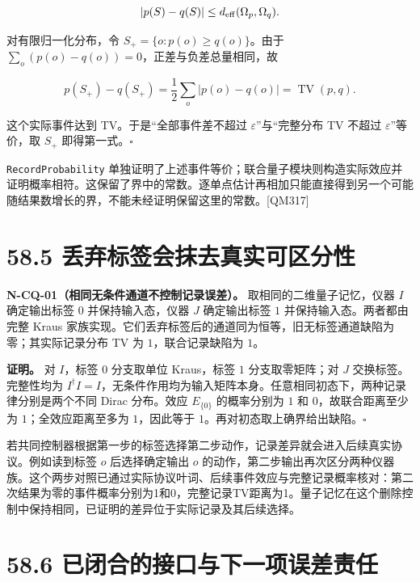 \documentclass[
  11pt,
  oneside]{book}
\begin{document}
\[
|p(S)-q(S)|\le d_{\rm eff}(\Omega_p,\Omega_q).
\]

对有限归一化分布，令 \(S_+=\{o:p(o)\ge q(o)\}\)。由于
\(\sum_o(p(o)-q(o))=0\)，正差与负差总量相同，故

\[
p(S_+)-q(S_+)=\frac12\sum_o|p(o)-q(o)|=\operatorname{TV}(p,q).
\]

这个实际事件达到 TV。于是``全部事件差不超过
\(\varepsilon\)''与``完整分布 TV 不超过 \(\varepsilon\)''等价，取
\(S_+\) 即得第一式。\(\square\)

\texttt{RecordProbability}
单独证明了上述事件等价；联合量子模块则构造实际效应并证明概率相符。这保留了界中的常数。逐单点估计再相加只能直接得到另一个可能随结果数增长的界，不能未经证明保留这里的常数。{[}QM317{]}

\hypertarget{ux4e22ux5f03ux6807ux7b7eux4f1aux62b9ux53bbux771fux5b9eux53efux533aux5206ux6027}{%
\section{58.5
丢弃标签会抹去真实可区分性}\label{ux4e22ux5f03ux6807ux7b7eux4f1aux62b9ux53bbux771fux5b9eux53efux533aux5206ux6027}}

\protect\hypertarget{n-cq-01}{}{}

\textbf{N-CQ-01（相同无条件通道不控制记录误差）。}
取相同的二维量子记忆，仪器 \(I\) 确定输出标签 \(0\) 并保持输入态，仪器
\(J\) 确定输出标签 \(1\) 并保持输入态。两者都由完整 Kraus
家族实现。它们丢弃标签后的通道同为恒等，旧无标签通道缺陷为零；其实际记录分布
TV 为 \(1\)，联合记录缺陷为 \(1\)。

\textbf{证明。} 对 \(I\)，标签 \(0\) 分支取单位 Kraus，标签 \(1\)
分支取零矩阵；对 \(J\) 交换标签。完整性均为
\(I^\dagger I=I\)，无条件作用均为输入矩阵本身。任意相同初态下，两种记录律分别是两个不同
Dirac 分布。效应 \(E_{\{0\}}\) 的概率分别为 \(1\) 和
\(0\)，故联合距离至少为 \(1\)；全效应距离至多为 \(1\)，因此等于
\(1\)。再对初态取上确界给出缺陷。\(\square\)

若共同控制器根据第一步的标签选择第二步动作，记录差异就会进入后续真实协议。例如读到标签
\(o\) 后选择确定输出 \(o\)
的动作，第二步输出再次区分两种仪器族。这个两步对照已通过实际协议叶词、后续事件效应与完整记录概率核对：第二次结果为零的事件概率分别为1和0，完整记录TV距离为1。量子记忆在这个删除控制中保持相同，已证明的差异位于实际记录及其后续选择。

\hypertarget{ux5df2ux95edux5408ux7684ux63a5ux53e3ux4e0eux4e0bux4e00ux9879ux8befux5deeux8d23ux4efb}{%
\section{58.6
已闭合的接口与下一项误差责任}\label{ux5df2ux95edux5408ux7684ux63a5ux53e3ux4e0eux4e0bux4e00ux9879ux8befux5deeux8d23ux4efb}}
\end{document}
